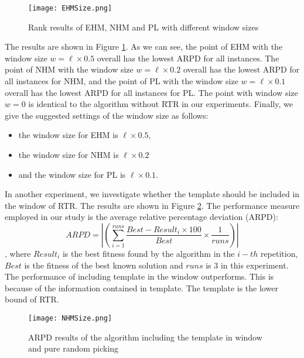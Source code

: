 \begin{figure}[htbp] 
        \centering
        \texttt{[image: EHMSize.png]}
        \caption{ Rank results of EHM, NHM and PL with different window sizes } 
        \label{fig:w_size}
\end{figure}



The results are shown in Figure \ref{fig:w_size}. As we can see, the point of EHM with the window size $w=\ell\times 0.5$ overall has the lowest ARPD for all instances. The point of NHM with the window size $w=\ell\times 0.2$ overall has the lowest ARPD for all instances for NHM, and the point of PL with the window size $w=\ell\times 0.1$ overall has the lowest ARPD for all instances for PL. The point with window size $w=0$ is identical to the algorithm without RTR in our experiments. Finally, we give the suggested settings of the window size as follows:
\begin{itemize}
    \item the window size for EHM is $\ell\times 0.5$,
    \item the window size for NHM is $\ell\times 0.2$
    \item and the window size for PL is $\ell\times 0.1$.
\end{itemize}




In another experiment, we investigate whether the template should be included in the window of RTR. The results are shown in Figure \ref{fig:w_template}. The performance measure employed in our study is the average relative percentage deviation (ARPD):\[ARPD=\left|\left(\sum_{i=1}^{runs}\frac{Best-Result_i\times 100}{Best} \times \frac{1}{runs}\right)\right|\], where $Result_i$ is the best fitness found by the algorithm in the $i-th$ repetition, $Best$ is the fitness of the best known solution and $runs$ is 3 in this experiment. The performance of including template in the window outperforms. This is because of the information contained in template. The template is the lower bound of RTR.


\begin{figure}[htbp] 
        \centering
        \texttt{[image: NHMSize.png]}
            \caption{ARPD results of the algorithm including the template in window and pure random picking} 
        \label{fig:w_template}
\end{figure}
